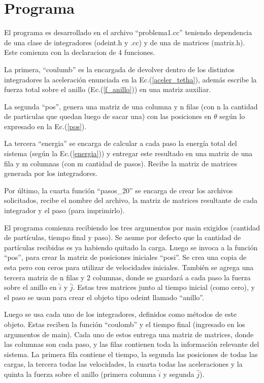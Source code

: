 \documentclass[12pt]{article}
\begin{document}
\section{Programa}
El programa es desarrollado en el archivo ``problema1.cc'' teniendo dependencia de una clase de integradores (odeint.h y .cc) y de una de matrices (matriz.h). Este comienza con la declaracion de 4 funciones. 

La primera, ``coulumb'' es la encargada de devolver dentro de los distintos integradores la aceleración enunciada en la Ec.(\ref{aceler_tetha}), además escribe la fuerza total sobre el anillo (Ec.(\ref{f_anillo})) en una matriz auxiliar.

La segunda ``pos'', genera una matriz de una columna y n filas (con n la cantidad de particulas que quedan luego de sacar una) con las posiciones en $\theta$ según lo expresado en la Ec.(\ref{pos}).

La tercera ``energia'' se encarga de calcular a cada paso la energía total del sistema (según la Ec.(\ref{energia})) y entregar este resultado en una matriz de una fila y m columnas (con m cantidad de pasos). Recibe la matriz de matrices generada por los integradores.

Por último, la cuarta función ``pasos\_20'' se encarga de crear los archivos solicitados, recibe el nombre del archivo, la matriz de matrices resultante de cada integrador y el paso (para imprimirlo).

El programa comienza recibiendo los tres argumentos por main exigidos (cantidad de partículas, tiempo final y paso). Se asume por defecto que la cantidad de partículas recibidas es ya habiendo quitado la carga. Luego se invoca a la función ``pos'', para crear la matriz de posiciones iniciales ``posi''. Se crea una copia de esta pero con ceros para utilizar de velocidades iniciales. También se agrega una tercera matriz de n filas y 2 columnas, donde se guardará a cada paso la fuerza sobre el anillo en $\hat{i}$ y $\hat{j}$.
Estas tres matrices junto al tiempo inicial (como cero), y el paso se usan para crear el objeto tipo odeint llamado ``anillo''.

Luego se usa cada uno de los integradores, definidos como métodos de este objeto. Estas reciben la función ``coulomb'' y el tiempo final (ingresado en los argumentos de main). Cada uno de estos entrega una matriz de matrices, donde las columnas son cada paso, y las filas contienen toda la información relevante del sistema. La primera fila contiene el tiempo, la segunda las posiciones de todas las cargas, la tercera todas las velocidades, la cuarta todas las aceleraciones y la quinta la fuerza sobre el anillo (primera columna $\hat{i}$ y segunda $\hat{j}$).
\end{document}
